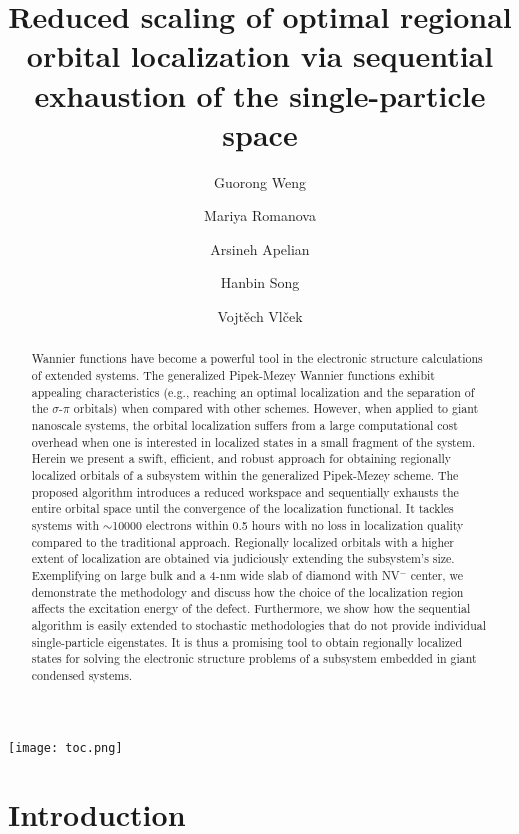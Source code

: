 \documentclass[journal=jacsat,manuscript=article]{achemso}
\author{Guorong Weng}
\author{Mariya Romanova}
\author{Arsineh Apelian}
\author{Hanbin Song}
\author{Vojt\v{e}ch Vl\v{c}ek}%
\affiliation{Department of Chemistry and Biochemistry, University of California, Santa Barbara, CA 93106-9510, U.S.A.}%
\title{Reduced scaling of optimal regional orbital localization via sequential exhaustion of the single-particle space}%
\begin{document}
\begin{tocentry}
    \centering
    \texttt{[image: toc.png]}
    \label{fig:TOCentry}
\end{tocentry}

\begin{abstract}
Wannier functions have become a powerful tool in the electronic structure calculations of extended systems. The generalized Pipek-Mezey Wannier functions exhibit appealing characteristics (e.g., reaching an optimal localization and the separation of the $\sigma$-$\pi$ orbitals) when compared with other schemes. However, when applied to giant nanoscale systems, the orbital localization suffers from a large computational cost overhead when one is interested in localized states in a small fragment of the system. Herein we present a swift, efficient, and robust approach for obtaining regionally localized orbitals of a subsystem within the generalized Pipek-Mezey scheme. The proposed algorithm introduces a reduced workspace and sequentially exhausts the entire orbital space until the convergence of the localization functional. It tackles systems with $\sim$10000 electrons within 0.5 hours with no loss in localization quality compared to the traditional approach. Regionally localized orbitals with a higher extent of localization are obtained via judiciously extending the subsystem's size. Exemplifying on large bulk and a 4-nm wide slab of diamond with NV$^-$ center, we demonstrate the methodology and discuss how the choice of the localization region affects the excitation energy of the defect. Furthermore, we show how the sequential algorithm is easily extended to stochastic methodologies that do not provide individual single-particle eigenstates.  It is thus a promising tool to obtain regionally localized states for solving the electronic structure problems of a subsystem embedded in giant condensed systems.
\end{abstract}


\maketitle


\section{\label{sec:intro}Introduction}
\end{document}
